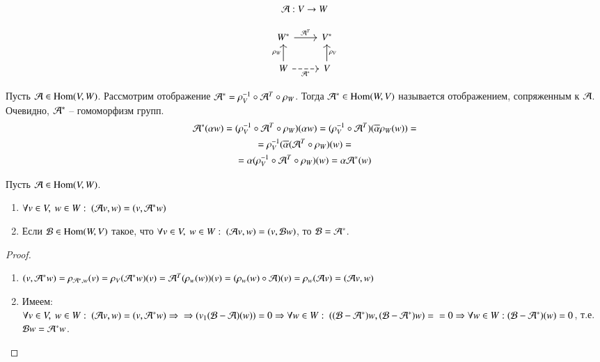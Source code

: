 \documentclass[main]{subfiles}
\begin{document}
\[ \mathcal{A}: V \rightarrow W\]

\[\begin{tikzcd}
        {W^*} & {V^*} \\
        W & V
        \arrow["{\mathcal{A}^T}", from=1-1, to=1-2]
        \arrow["{\rho_V}"', from=2-2, to=1-2]
        \arrow["{\rho_W}", from=2-1, to=1-1]
        \arrow["{\mathcal{A}^*}"', dashed, from=2-1, to=2-2]
    \end{tikzcd}\]

Пусть $\mathcal{A} \in \operatorname{Hom}(V, W)$. Рассмотрим отображение $\mathcal{A}^* = \rho_V^{-1} \circ \mathcal{A}^T \circ \rho_W$. Тогда $\mathcal{A}^* \in \operatorname{Hom}(W, V)$ называется отображением, сопряженным к $\mathcal{A}$.
Очевидно, $\mathcal{A}^*$ -- гомоморфизм групп.
\begin{gather*}
    \mathcal{A}^*(\alpha w) = (\rho_V^{-1} \circ \mathcal{A}^T \circ \rho_W)(\alpha w) = (\rho_V^{-1} \circ \mathcal{A}^T)(\overline{\alpha} \rho_W(w)) = \\
    = \rho_V^{-1} (\overline{\alpha} ( \mathcal{A}^T \circ \rho_W)(w) = \\
    = \alpha (\rho_V^{-1} \circ \mathcal{A}^T \circ \rho_W) (w) = \alpha \mathcal{A}^* (w)
\end{gather*}

\begin{proposition} 
    Пусть $\mathcal{A} \in \operatorname{Hom}(V, W)$.

    \begin{enumerate}
        \item $\forall v \in V, \ w \in W: \ (\mathcal{A} v, w) = (v, \mathcal{A}^* w)$
        \item Если $\mathcal{B} \in \operatorname{Hom} (W, V)$ такое, что $\forall v \in V, \ w \in W: \ (\mca v, w) = (v, \mcb w)$,  то $\mathcal{B} = \mathcal{A}^*$.
    \end{enumerate}
\end{proposition}

\begin{proof}
    \begin{enumerate}
        \item $(v, \mathcal{A}^* w) = \rho_{\mathcal{A}^*, w} (v) = \rho_V (\mathcal{A}^*w)(v) = \mathcal{A}^T(\rho_w(w))(v) = (\rho_w(w) \circ \mathcal{A})(v) = \rho_w (\mathcal{A} v) = (\mathcal{A} v, w)$
        \item Имеем: $\forall v \in V, \ w \in W: \ (\mca v, w) = (v, \mca^* w) \Rightarrow \\ \Rightarrow (v_1 (\mcb - \mca)(w)) = 0 \Rightarrow \forall w \in W: \ ((\mcb - \mca^*)w, (\mcb - \mca^*)w) = \\ = 0 \Rightarrow \forall w \in W: (\mcb - \mca^*)(w) = 0$, т.е. $\mathcal{B} w = \mathcal{A}^* w$.
    \end{enumerate}
\end{proof}
\end{document}
